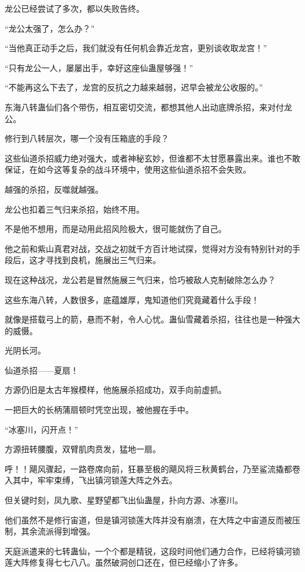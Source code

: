 \begin{this_body}
龙公已经尝试了多次，都以失败告终。

“龙公太强了，怎么办？”

“当他真正动手之后，我们就没有任何机会靠近龙宫，更别谈收取龙宫！”

“只有龙公一人，屡屡出手，幸好这座仙蛊屋够强！”

“不能再这么下去了，龙宫的反抗之力越来越弱，迟早会被龙公收服的。”

东海八转蛊仙们各个带伤，相互密切交流，都想其他人出动底牌杀招，来对付龙公。

修行到八转层次，哪一个没有压箱底的手段？

这些仙道杀招威力绝对强大，或者神秘玄妙，但谁都不太甘愿暴露出来。谁也不敢保证，在如今这等复杂的战斗环境中，使用这些仙道杀招不会失败。

越强的杀招，反噬就越强。

龙公也扣着三气归来杀招，始终不用。

不是他不想用，而是动用此招风险极大，很可能就伤了自己。

他之前和紫山真君对战，交战之初就千方百计地试探，觉得对方没有特别针对的手段后，这才寻找到良机，施展出三气归来。

现在这种战况，龙公若是冒然施展三气归来，恰巧被敌人克制破除怎么办？

这些东海八转，人数很多，底蕴雄厚，鬼知道他们究竟藏着什么手段！

就像是搭载弓上的箭，悬而不射，令人心忧。蛊仙雪藏着杀招，往往也是一种强大的威慑。

光阴长河。

仙道杀招——夏扇！

方源仍旧是太古年猴模样，他施展杀招成功，双手向前虚抓。

一把巨大的长柄蒲扇顿时凭空出现，被他握在手中。

“冰塞川，闪开点！”

方源扭转腰腹，双臂肌肉贲发，猛地一扇。

呼！！飓风骤起，一路卷席向前，狂暴至极的飓风将三秋黄鹤台，乃至鲨流撬都卷入其中，牢牢束缚，飞出镇河锁莲大阵之外去。

但关键时刻，凤九歌、星野望都飞出仙蛊屋，扑向方源、冰塞川。

他们虽然不是修行宙道，但是镇河锁莲大阵并没有崩溃，在大阵之中宙道反而被压制，其余流派得到增强。

天庭派遣来的七转蛊仙，一个个都是精锐，这段时间他们通力合作，已经将镇河锁莲大阵修复得七七八八。虽然破洞创口还在，但已经缩小了许多。


\end{this_body}
